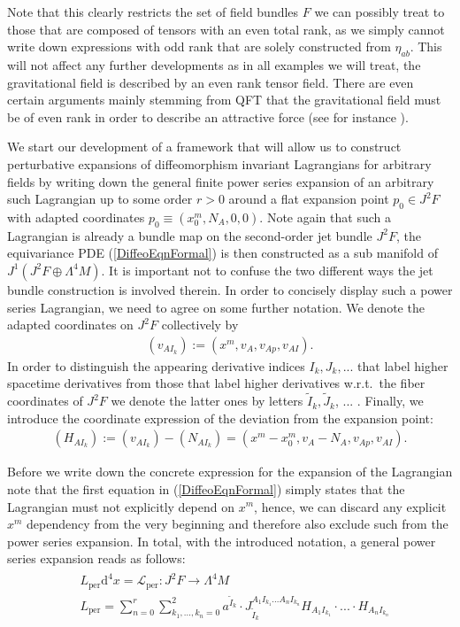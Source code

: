 Note that this clearly restricts the set of field bundles $F$ we can possibly treat to those that are composed of tensors with an even total rank, as we simply cannot write down expressions with odd rank that are solely constructed from $\eta_{ab}$. This will not affect any further developments as in all examples we will treat, the gravitational field is described by an even rank tensor field. There are even certain arguments mainly stemming from QFT that the gravitational field must be of even rank in order to describe an attractive force (see for instance \cite{vecchiato2017variational}). 

We start our development of a framework that will allow us to construct perturbative expansions of diffeomorphism invariant Lagrangians for arbitrary fields by writing down the general finite power series expansion of an arbitrary such Lagrangian up to some order $r > 0$ around a flat expansion point $p_0 \in J^2F$ with adapted coordinates $p_0 \equiv (x_0^m,N_A, 0, 0)$. Note again that such a Lagrangian is already a bundle map on the second-order jet bundle $J^2F$, the equivariance PDE (\ref{DiffeoEqnFormal}) is then constructed as a sub manifold of $J^1(J^2F \oplus \Lambda^4M)$. It is important not to confuse the two different ways the jet bundle construction is involved therein. In order to concisely display such a power series Lagrangian, we need to agree on some further notation. We denote the adapted coordinates on $J^2F$ collectively by
\begin{align}
    (v_{AI_k}) := (x^m,v_A,v_{Ap},v_{AI}).
\end{align}
In order to distinguish the appearing derivative indices $I_k,J_k,...$ that label higher spacetime derivatives from those that label higher derivatives w.r.t.\ the fiber coordinates of $J^2F$ we denote the latter ones by letters
$\tilde{I}_k, \tilde{J}_k$, ... . Finally, we introduce the coordinate expression of the deviation from the expansion point: 
\begin{align}
    (H_{AI_k}) := (v_{AI_k}) - (N_{AI_k}) = (x^m-x_0^m,v_A-N_A,v_{Ap},v_{AI}).
\end{align}

Before we write down the concrete expression for the expansion of the Lagrangian note that the first equation in (\ref{DiffeoEqnFormal}) simply states that the Lagrangian must not explicitly depend on $x^m$, hence, we can discard any explicit $x^m$ dependency from the very beginning and therefore also exclude such from the power series expansion. In total, with the introduced notation, a general power series expansion reads as follows: 
\begin{align} \label{generalPowerSL}
    \begin{aligned}
    &L_{\text{per}}  \mathrm{d}^4x = \mathcal{L}_{\text{per}} : J^2F \longrightarrow \Lambda^4M \\
    &L_{\text{per}} = \sum_{n=0}^r \sum_{k_1,...,k_n = 0}^2 a^{\tilde{I}_k} \cdot J_{\tilde{I}_k}^{A_1I_{k_1}...A_nI_{k_n}} H_{A_1I_{k_1}} \cdot ... \cdot H_{A_nI_{k_n}}
    \end{aligned}
\end{align}

